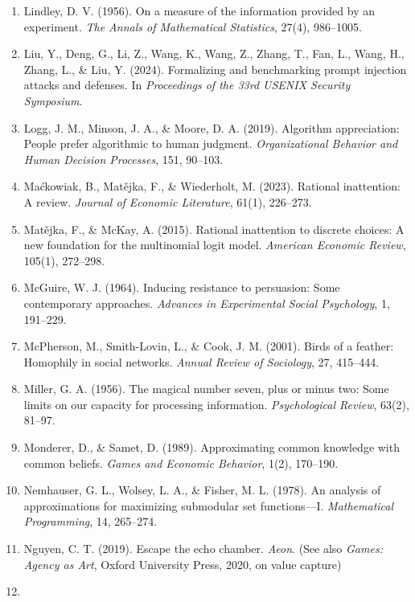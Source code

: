 \documentclass[
  11pt]{article}
\begin{document}
\begin{enumerate}
  Cook, J. (2012). Misinformation and its correction: Continued
  influence and successful debiasing. \emph{Psychological Science in the
  Public Interest}, 13(3), 106--120.
\item
  Lindley, D. V. (1956). On a measure of the information provided by an
  experiment. \emph{The Annals of Mathematical Statistics}, 27(4),
  986--1005.
\item
  Liu, Y., Deng, G., Li, Z., Wang, K., Wang, Z., Zhang, T., Fan, L.,
  Wang, H., Zhang, L., \& Liu, Y. (2024). Formalizing and benchmarking
  prompt injection attacks and defenses. In \emph{Proceedings of the
  33rd USENIX Security Symposium}.
\item
  Logg, J. M., Minson, J. A., \& Moore, D. A. (2019). Algorithm
  appreciation: People prefer algorithmic to human judgment.
  \emph{Organizational Behavior and Human Decision Processes}, 151,
  90--103.
\item
  Maćkowiak, B., Matějka, F., \& Wiederholt, M. (2023). Rational
  inattention: A review. \emph{Journal of Economic Literature}, 61(1),
  226--273.
\item
  Matějka, F., \& McKay, A. (2015). Rational inattention to discrete
  choices: A new foundation for the multinomial logit model.
  \emph{American Economic Review}, 105(1), 272--298.
\item
  McGuire, W. J. (1964). Inducing resistance to persuasion: Some
  contemporary approaches. \emph{Advances in Experimental Social
  Psychology}, 1, 191--229.
\item
  McPherson, M., Smith-Lovin, L., \& Cook, J. M. (2001). Birds of a
  feather: Homophily in social networks. \emph{Annual Review of
  Sociology}, 27, 415--444.
\item
  Miller, G. A. (1956). The magical number seven, plus or minus two:
  Some limits on our capacity for processing information.
  \emph{Psychological Review}, 63(2), 81--97.
\item
  Monderer, D., \& Samet, D. (1989). Approximating common knowledge with
  common beliefs. \emph{Games and Economic Behavior}, 1(2), 170--190.
\item
  Nemhauser, G. L., Wolsey, L. A., \& Fisher, M. L. (1978). An analysis
  of approximations for maximizing submodular set functions---I.
  \emph{Mathematical Programming}, 14, 265--274.
\item
  Nguyen, C. T. (2019). Escape the echo chamber. \emph{Aeon}. (See also
  \emph{Games: Agency as Art}, Oxford University Press, 2020, on value
  capture)
\item

\end{enumerate}
\end{document}
